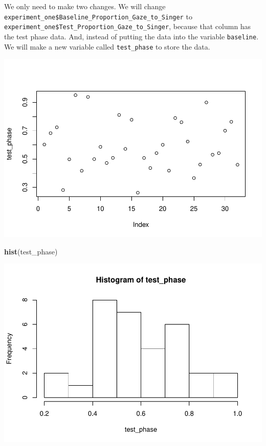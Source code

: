 \documentclass[]{book}
\newenvironment{Shaded}{\begin{snugshade}}{\end{snugshade}}
\newcommand{\KeywordTok}[1]{\textcolor[rgb]{0.13,0.29,0.53}{\textbf{#1}}}
\newcommand{\StringTok}[1]{\textcolor[rgb]{0.31,0.60,0.02}{#1}}
\newcommand{\OperatorTok}[1]{\textcolor[rgb]{0.81,0.36,0.00}{\textbf{#1}}}
\newcommand{\NormalTok}[1]{#1}
\begin{document}
We only need to make two changes. We will change
\texttt{experiment\_one\$Baseline\_Proportion\_Gaze\_to\_Singer} to
\texttt{experiment\_one\$Test\_Proportion\_Gaze\_to\_Singer}, because
that column has the test phase data. And, instead of putting the data
into the variable \texttt{baseline}. We will make a new variable called
\texttt{test\_phase} to store the data.

\begin{Shaded}
\end{Shaded}

\includegraphics{Statistics_Lab_files/figure-latex/unnamed-chunk-168-1.pdf}

\begin{Shaded}
\begin{Highlighting}[]
\KeywordTok{hist}\NormalTok{(test_phase)}
\end{Highlighting}
\end{Shaded}

\includegraphics{Statistics_Lab_files/figure-latex/unnamed-chunk-168-2.pdf}
\end{document}

